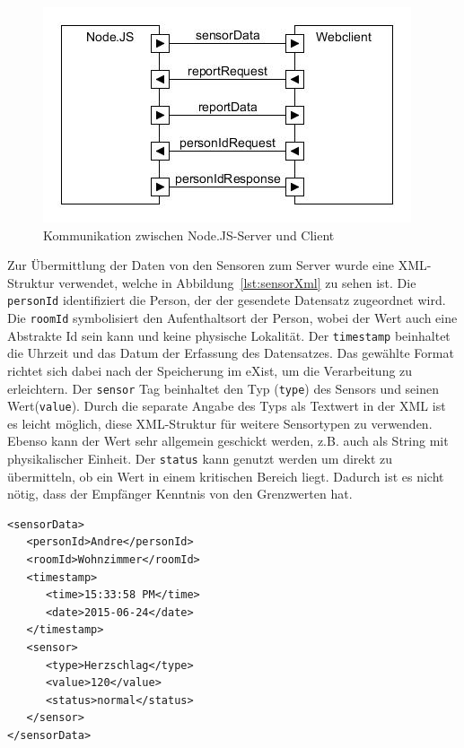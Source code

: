 \begin{figure}[h]
\begin{center}
\includegraphics[scale=0.6]{images/komm3.jpg} 
\caption{Kommunikation zwischen Node.JS-Server und Client}
\end{center}
\end{figure}

\newpage
Zur Übermittlung der Daten von den Sensoren zum Server wurde eine XML-Struktur verwendet, welche in Abbildung~\ref{lst:sensorXml} zu sehen ist. Die \texttt{personId} identifiziert die Person, der der gesendete Datensatz zugeordnet wird. Die \texttt{roomId} symbolisiert den Aufenthaltsort der Person, wobei der Wert auch eine Abstrakte Id sein kann und keine physische Lokalität. Der \texttt{timestamp} beinhaltet die Uhrzeit und das Datum der Erfassung des Datensatzes. Das gewählte Format richtet sich dabei nach der Speicherung im eXist, um die Verarbeitung zu erleichtern. Der \texttt{sensor} Tag beinhaltet den Typ (\texttt{type}) des Sensors und seinen Wert(\texttt{value}). Durch die separate Angabe des Typs als Textwert in der XML ist es leicht möglich, diese XML-Struktur für weitere Sensortypen zu verwenden. Ebenso kann der Wert sehr allgemein geschickt werden, z.B. auch als String mit physikalischer Einheit. Der \texttt{status} kann genutzt werden um direkt zu übermitteln, ob ein Wert in einem kritischen Bereich liegt. Dadurch ist es nicht nötig, dass der Empfänger Kenntnis von den Grenzwerten hat.

\begin{lstlisting}[caption={SensorXML},label=lst:sensorXml]
<sensorData>
   <personId>Andre</personId>
   <roomId>Wohnzimmer</roomId>
   <timestamp>
      <time>15:33:58 PM</time>
      <date>2015-06-24</date>
   </timestamp>
   <sensor>
      <type>Herzschlag</type>
      <value>120</value>
      <status>normal</status>
   </sensor>
</sensorData>
\end{lstlisting}
